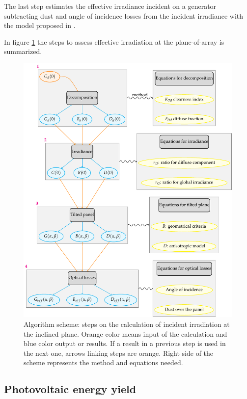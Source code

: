 The last step estimates the effective irradiance incident on a generator subtracting dust and angle of incidence losses from the incident irradiance with the model proposed in \cite{Martin2001}.

In figure \ref{fig:algorithm_outline} the steps to assess effective irradiation at the plane-of-array is summarized.

\begin{figure}
  \centering
  \includegraphics[width=1\textwidth]{DataMethodsFIGS/algorithm_outline}
  \caption[Steps for obtaining $G_{eff}$]{Algorithm scheme: steps on the calculation of incident irradiation at the inclined plane. Orange color means input of the calculation and blue color output or results. If a result in a previous step is used in the next one, arrows linking steps are orange. Right side of the scheme represents the method and equations needed.}
 \label{fig:algorithm_outline}
\end{figure}

\subsection{Photovoltaic energy yield}

